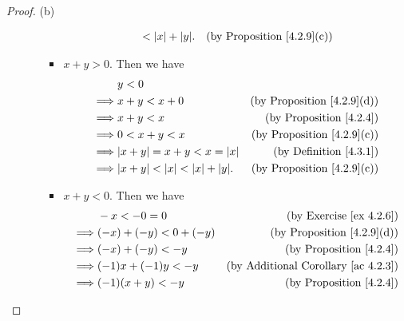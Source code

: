 \begin{proof}{(b)}
\begin{itemize}
\begin{itemize}
\begin{itemize}
\begin{align*}
                                                  & < \abs{x} + \abs{y}. & \text{(by Proposition \ref{4.2.9}(c))}
                                  \end{align*}
                            \item \(x + y > 0\).
                                  Then we have
                                  \begin{align*}
                                               & y < 0                                                                               \\
                                      \implies & x + y < x + 0                              & \text{(by Proposition \ref{4.2.9}(d))} \\
                                      \implies & x + y < x                                  & \text{(by Proposition \ref{4.2.4})}    \\
                                      \implies & 0 < x + y < x                              & \text{(by Proposition \ref{4.2.9}(c))} \\
                                      \implies & \abs{x + y} = x + y < x = \abs{x}          & \text{(by Definition \ref{4.3.1})}     \\
                                      \implies & \abs{x + y} < \abs{x} < \abs{x} + \abs{y}. & \text{(by Proposition \ref{4.2.9}(c))}
                                  \end{align*}
                            \item \(x + y < 0\).
                                  Then we have
                                  \begin{align*}
                                               & -x < -0 = 0                                & \text{(by Exercise \ref{ex 4.2.6})}             \\
                                      \implies & (-x) + (-y) < 0 + (-y)                     & \text{(by Proposition \ref{4.2.9}(d))}          \\
                                      \implies & (-x) + (-y) < -y                           & \text{(by Proposition \ref{4.2.4})}             \\
                                      \implies & (-1)x + (-1)y < -y                         & \text{(by Additional Corollary \ref{ac 4.2.3})} \\
                                      \implies & (-1)(x + y) < -y                           & \text{(by Proposition \ref{4.2.4})}             \\

\end{align*}
\end{itemize}
\end{itemize}
\end{itemize}
\end{proof}
